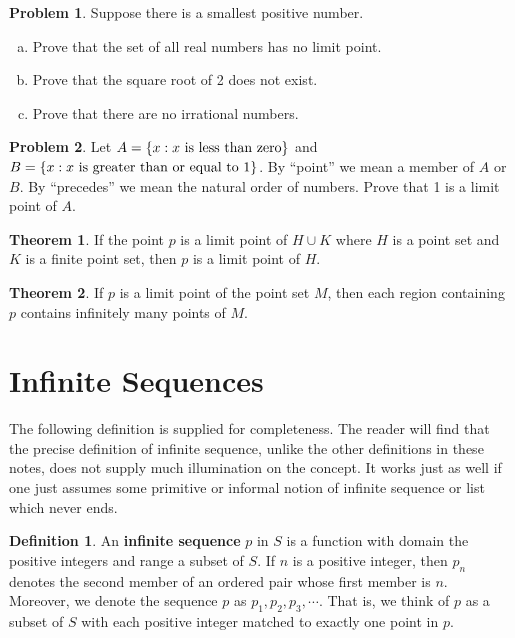 \documentclass{article}
\theoremstyle{definition}
\newtheorem{definition}{Definition}
\newtheorem{theorem}{Theorem}
\theoremstyle{definition}
\newtheorem{problem}{Problem}
\theoremstyle{plain}
\begin{document}
\begin{problem}
  Suppose there is a smallest positive number.

  \begin{enumerate}[a.]
    \item Prove that the set of all real numbers has no limit point.
    \item Prove that the square root of 2 does not exist.
    \item Prove that there are no irrational numbers.
  \end{enumerate}
\end{problem}

\begin{problem}
  Let $A = \{x : x \textnormal{ is less than zero} \}$ and $B = \{ x : x
  \textnormal{ is greater than or equal to 1} \}$.  By ``point'' we mean a member of
  $A$ or $B$. By ``precedes'' we mean the natural order of numbers.  Prove that
  1 is a limit point of $A$.
\end{problem}

\begin{theorem}
  If the point $p$ is a limit point of $H \cup K$ where $H$ is a point set and
  $K$ is a finite point set, then $p$ is a limit point of $H$.
\end{theorem}

\begin{theorem}
  If $p$ is a limit point of the point set $M$, then each region containing $p$
  contains infinitely many points of $M$.
\end{theorem}

\section*{Infinite Sequences}

The following definition is supplied for completeness.  The reader will find
that the precise definition of infinite sequence, unlike the other definitions
in these notes, does not supply much illumination on the concept.  It works
just as well if one just assumes some primitive or informal notion of infinite
sequence or list which never ends.

\begin{definition}
  An \textbf{infinite sequence} $p$ in $S$ is a function with domain the
  positive integers and range a subset of $S$. If $n$ is a positive integer,
  then $p_n$ denotes the second member of an ordered pair whose first member is
  $n$.  Moreover, we denote the sequence $p$ as $p_1, p_2, p_3, \cdots$. That
  is, we think of $p$ as a subset of $S$ with each positive integer matched to
  exactly one point in $p$.
\end{definition}
\end{document}

